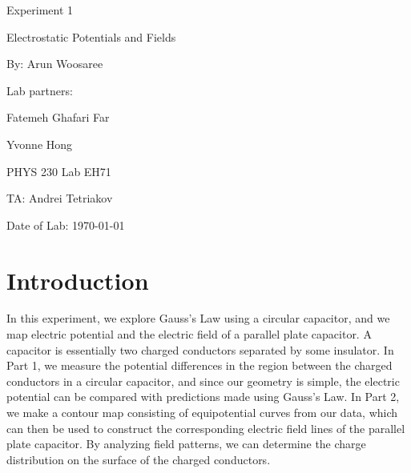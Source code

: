 \documentclass[letterpaper]{article}
\begin{document}
  \begin{titlepage}
    \begin{center}
        \vspace*{1cm}
        \Huge
        Experiment 1
        \vspace{1cm}

        Electrostatic Potentials and Fields
        \vspace{1cm}

        By: Arun Woosaree
        \vspace{1cm}

        Lab partners:
        \vspace{.25cm}
        \Large

        Fatemeh Ghafari Far

        Yvonne Hong
        \vspace{1cm}

        \Huge
        PHYS 230 Lab EH71
        \vspace{1cm}

        TA: Andrei Tetriakov
        \vspace{1cm}

        Date of Lab: \today
        \vfill
    \end{center}
\end{titlepage}

\section{Introduction}

In this experiment, we explore Gauss's Law using a circular capacitor, and
we map electric potential and the electric field of a parallel plate capacitor.
A capacitor is essentially two charged conductors separated by some insulator.
In Part 1, we measure the potential differences in the region between the charged conductors in a circular capacitor,
and since our geometry is simple, the electric potential can be compared with
predictions made using Gauss's Law. In Part 2, we make a contour map consisting of equipotential
curves from our data, which can then be used to construct the corresponding electric field lines
of the parallel plate capacitor.
By analyzing field patterns, we can determine the charge distribution on the surface of
the charged conductors.
\end{document}
